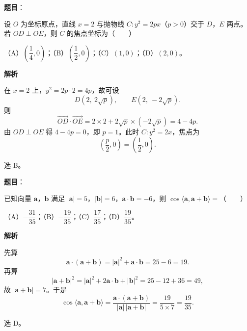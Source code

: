 \begin{answer}

\textbf{题目}：

设 $O$ 为坐标原点，直线 $x=2$ 与抛物线 $C:y^2=2px$（$p>0$）交于 $D$，$E$ 两点。若 $OD\perp OE$，则 $C$ 的焦点坐标为\mbox{（　　）}

（A）$\left(\dfrac14,0\right)$；（B）$\left(\dfrac12,0\right)$；（C）$(1,0)$；（D）$(2,0)$。

\textbf{解析}

在 $x=2$ 上，$y^2=2p\cdot2=4p$，故可设
\nopagebreak[4]
\[D(2,\ 2\sqrt p),\qquad E(2,\ -2\sqrt p).\]
则
\nopagebreak[4]
\[\overrightarrow{OD}\cdot\overrightarrow{OE}=2\times2+2\sqrt p\times(-2\sqrt p)=4-4p .\]
由 $OD\perp OE$ 得 $4-4p=0$，即 $p=1$。此时 $C:y^2=2x$，焦点为
\nopagebreak[4]
\[\left(\frac p2,0\right)=\left(\frac12,0\right).\]

选 B。


\end{answer}
\begin{answer}

\textbf{题目}：

已知向量 $\boldsymbol a$，$\boldsymbol b$ 满足 $|\boldsymbol a|=5$，$|\boldsymbol b|=6$，$\boldsymbol a\cdot\boldsymbol b=-6$，则 $\cos\langle\boldsymbol a,\boldsymbol a+\boldsymbol b\rangle=$\mbox{（　　）}

（A）$-\dfrac{31}{35}$；（B）$-\dfrac{19}{35}$；（C）$\dfrac{17}{35}$；（D）$\dfrac{19}{35}$。

\textbf{解析}

先算
\nopagebreak[4]
\[\boldsymbol a\cdot(\boldsymbol a+\boldsymbol b)=|\boldsymbol a|^2+\boldsymbol a\cdot\boldsymbol b=25-6=19 .\]
再算
\nopagebreak[4]
\[|\boldsymbol a+\boldsymbol b|^2=|\boldsymbol a|^2+2\boldsymbol a\cdot\boldsymbol b+|\boldsymbol b|^2=25-12+36=49,\]
故 $|\boldsymbol a+\boldsymbol b|=7$。于是
\nopagebreak[4]
\[\cos\langle\boldsymbol a,\boldsymbol a+\boldsymbol b\rangle=\frac{\boldsymbol a\cdot(\boldsymbol a+\boldsymbol b)}{|\boldsymbol a|\,|\boldsymbol a+\boldsymbol b|}=\frac{19}{5\times7}=\frac{19}{35} .\]

选 D。


\end{answer}
